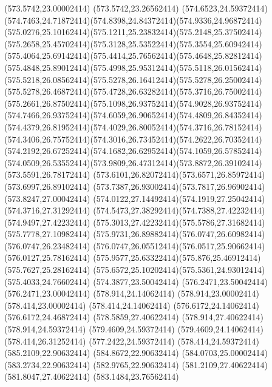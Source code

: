 {{	\closepath
	\moveto(573.5742,23.00002414)
	\lineto(573.5742,23.26562414)
	\lineto(574.6523,24.59372414)
	\curveto(574.7463,24.71872414)(574.8398,24.84372414)(574.9336,24.96872414)
	\curveto(575.0276,25.10162414)(575.1211,25.23832414)(575.2148,25.37502414)
	\curveto(575.2658,25.45702414)(575.3128,25.53522414)(575.3554,25.60942414)
	\curveto(575.4064,25.69142414)(575.4414,25.76562414)(575.4648,25.82812414)
	\curveto(575.4848,25.89012414)(575.4998,25.95312414)(575.5118,26.01562414)
	\curveto(575.5218,26.08562414)(575.5278,26.16412414)(575.5278,26.25002414)
	\curveto(575.5278,26.46872414)(575.4728,26.63282414)(575.3716,26.75002414)
	\curveto(575.2661,26.87502414)(575.1098,26.93752414)(574.9028,26.93752414)
	\curveto(574.7466,26.93752414)(574.6059,26.90652414)(574.4809,26.84352414)
	\curveto(574.4379,26.81952414)(574.4029,26.80052414)(574.3716,26.78152414)
	\curveto(574.3406,26.75752414)(574.3016,26.73452414)(574.2622,26.70352414)
	\curveto(574.2192,26.67252414)(574.1682,26.62952414)(574.1059,26.57852414)
	\curveto(574.0509,26.53552414)(573.9809,26.47312414)(573.8872,26.39102414)
	\lineto(573.5591,26.78172414)
	\curveto(573.6101,26.82072414)(573.6571,26.85972414)(573.6997,26.89102414)
	\curveto(573.7387,26.93002414)(573.7817,26.96902414)(573.8247,27.00042414)
	\curveto(574.0122,27.14492414)(574.1919,27.25042414)(574.3716,27.31292414)
	\curveto(574.5473,27.38292414)(574.7388,27.42232414)(574.9497,27.42232414)
	\curveto(575.3013,27.42232414)(575.5786,27.31682414)(575.7778,27.10982414)
	\curveto(575.9731,26.89882414)(576.0747,26.60982414)(576.0747,26.23482414)
	\curveto(576.0747,26.05512414)(576.0517,25.90662414)(576.0127,25.78162414)
	\curveto(575.9577,25.63322414)(575.876,25.46912414)(575.7627,25.28162414)
	\curveto(575.6572,25.10202414)(575.5361,24.93012414)(575.4033,24.76602414)
	\lineto(574.3877,23.50042414)
	\lineto(576.2471,23.50042414)
	\lineto(576.2471,23.00042414)
	\closepath
	\moveto(578.914,24.14062414)
	\lineto(578.914,23.00002414)
	\lineto(578.414,23.00002414)
	\lineto(578.414,24.14062414)
	\lineto(576.6172,24.14062414)
	\lineto(576.6172,24.46872414)
	\lineto(578.5859,27.40622414)
	\lineto(578.914,27.40622414)
	\lineto(578.914,24.59372414)
	\lineto(579.4609,24.59372414)
	\lineto(579.4609,24.14062414)
	\closepath
	\moveto(578.414,26.31252414)
	\lineto(577.2422,24.59372414)
	\lineto(578.414,24.59372414)
	\closepath
	\moveto(585.2109,22.90632414)
	\lineto(584.8672,22.90632414)
	\lineto(584.0703,25.00002414)
	\lineto(583.2734,22.90632414)
	\lineto(582.9765,22.90632414)
	\lineto(581.2109,27.40622414)
	\lineto(581.8047,27.40622414)
	\lineto(583.1484,23.76562414)
}}
